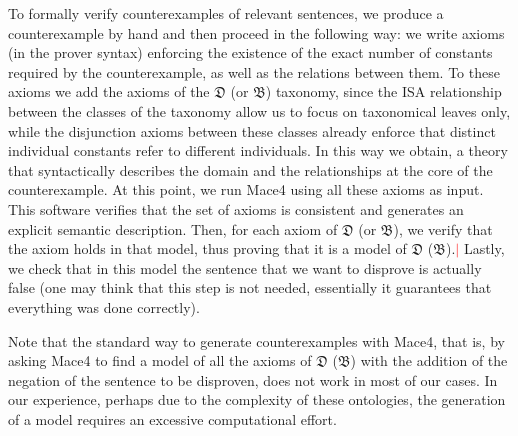 \documentclass[ao]{iosart2x}
\newcommand{\nb}[1]{\textcolor{red}{$|$}\marginpar{\hspace*{-0cm}\parbox{20mm}{\scriptsize\raggedright\textcolor{red}{#1}}}}
\newcommand{\dolce}{{\textsc{dolce}}}
\newcommand{\bfo}{{\textsc{bfo}}}
\newcommand {\thdolce} {\ensuremath{\mathfrak{D}}}
\newcommand {\thbfo} {\ensuremath{\mathfrak{B}}}
\begin{document}
To formally verify counterexamples of relevant sentences, we produce a counterexample by hand and then proceed in the following way: we write axioms (in the prover syntax) enforcing the existence of the exact number of constants required by the counterexample, as well as the relations between them. To these axioms we add the axioms of the {$\thdolce$} (or  {$\thbfo$}) taxonomy, %
since the ISA relationship between the classes of the taxonomy allow us to focus on taxonomical leaves only, while the disjunction axioms between these classes already enforce that distinct individual constants refer to different individuals. In this way we obtain, a theory that syntactically describes the domain and the relationships at the core of the counterexample. 
At this point, we run Mace4 using all these axioms as input. This software verifies that the set of axioms is consistent and generates an explicit semantic description. Then, for each axiom of {$\thdolce$} (or $\thbfo$), we verify that the axiom holds in that model, thus proving that it is a model of {$\thdolce$} ($\thbfo$).\nb{SB: il testo era ambiguo e ho cambiato, controllate} 
Lastly, we check that in this model the sentence that we want to disprove is actually false (one may think that this step is not needed, essentially it guarantees that everything was done correctly).

Note that the standard way to generate counterexamples with Mace4, that is, by asking Mace4 to find a model of all the axioms of {$\thdolce$} ($\thbfo$) with the addition of the negation of the sentence to be disproven, does not work in most of our cases. In our experience, perhaps due to the complexity of these ontologies, the generation of a model requires an excessive computational effort.

%
\end{document}
